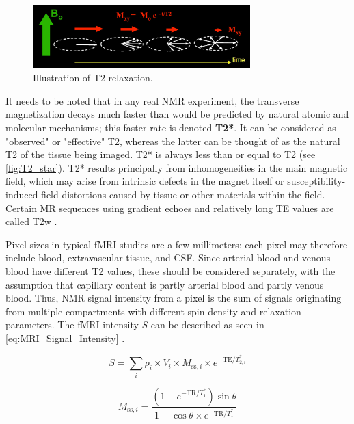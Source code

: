 \begin{figure}[htbp]
    \centering
    \includegraphics[width = 0.75\textwidth]{assets/images/T2_illustration.jpg}
    \caption{Illustration of T2 relaxation.}
    \label{fig:T2}
\end{figure}

It needs to be noted that in any real \gls{NMR} experiment, the transverse magnetization decays much faster than would be predicted by natural atomic and molecular mechanisms; this faster rate is denoted \textbf{T2*}. It can be considered as "observed" or "effective" T2, whereas the latter can be thought of as the natural T2 of the tissue being imaged. T2* is always less than or equal to T2 (see \autoref{fig:T2_star}). T2* results principally from inhomogeneities in the main magnetic field, which may arise from intrinsic defects in the magnet itself or susceptibility-induced field distortions caused by tissue or other materials within the field. Certain \gls{MR} sequences using gradient echoes and relatively long \gls{TE} values are called \gls{T2w} \cite{T2_star}.

Pixel sizes in typical \gls{fMRI} studies are a few millimeters; each pixel may therefore include blood, extravascular tissue, and \gls{CSF}. Since arterial blood and venous blood have different T2 values, these should be considered separately, with the assumption that capillary content is partly arterial blood and partly venous blood. Thus, \gls{NMR} signal intensity from a pixel is the sum of signals originating from multiple compartments with different spin density and relaxation parameters. The \gls{fMRI} intensity $S$ can be described as seen in \autoref{eq:MRI_Signal_Intensity} \cite{Kim2012}.

\begin{equation}
	\label{eq:MRI_Signal_Intensity}
	S = \sum_i \rho_i \times V_i \times M_{\text{ss},i} \times e^{-\text{TE}/T_{2,i}^*}
\end{equation}

\begin{equation}
	\label{eq:ss_magnetization}
	\displaystyle M_{\text{ss},i} = \frac{\left(1 - e^{-\text{TR}/T_1^*}\right) \sin\theta}{1 - \cos\theta \times e^{-\text{TR}/T_1^*}}
\end{equation}

